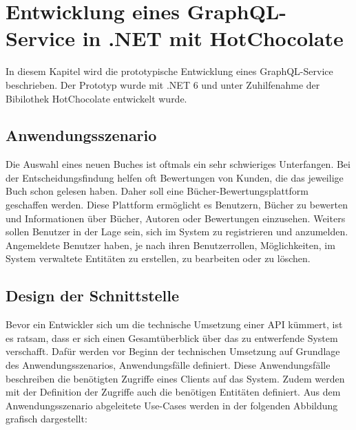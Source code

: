 \chapter{Entwicklung eines GraphQL-Service in .NET mit HotChocolate}
In diesem Kapitel wird die prototypische Entwicklung eines GraphQL-Service beschrieben.
Der Prototyp wurde mit .NET 6 und unter Zuhilfenahme der Bibilothek HotChocolate entwickelt wurde.

\section{Anwendungsszenario}
Die Auswahl eines neuen Buches ist oftmals ein sehr schwieriges Unterfangen.
Bei der Entscheidungsfindung helfen oft Bewertungen von Kunden, die das jeweilige Buch schon gelesen haben.
Daher soll eine Bücher-Bewertungsplattform geschaffen werden.
Diese Plattform ermöglicht es Benutzern, Bücher zu bewerten und Informationen über Bücher, Autoren oder Bewertungen einzusehen.
Weiters sollen Benutzer in der Lage sein, sich im System zu registrieren und anzumelden.
Angemeldete Benutzer haben, je nach ihren Benutzerrollen, Möglichkeiten, im System verwaltete Entitäten zu erstellen, zu bearbeiten oder zu löschen.

\section{Design der Schnittstelle}
Bevor ein Entwickler sich um die technische Umsetzung einer API kümmert, ist es ratsam, dass er sich einen Gesamtüberblick über das zu entwerfende System verschafft.
Dafür werden vor Beginn der technischen Umsetzung auf Grundlage des Anwendungsszenarios, Anwendungsfälle definiert.
Diese Anwendungsfälle beschreiben die benötigten Zugriffe eines Clients auf das System.
Zudem werden mit der Definition der Zugriffe auch die benötigen Entitäten definiert.
Aus dem Anwendungsszenario abgeleitete Use-Cases werden in der folgenden Abbildung grafisch dargestellt:

